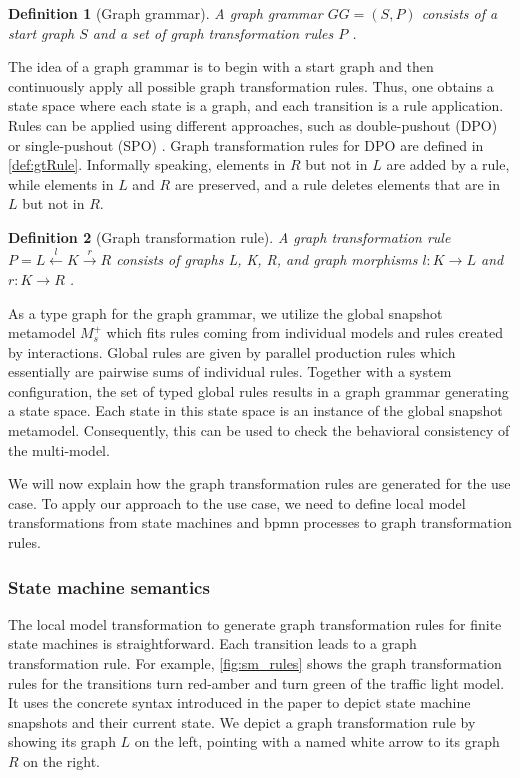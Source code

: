 \documentclass{jot}
\newtheorem{definition}{Definition}
\begin{document}
\begin{definition}[Graph grammar] \label{def:graphGrammar}
A graph grammar $GG=(S, P)$ consists of a start graph $S$ and a set of graph transformation rules $P$ \cite{ehrigFundamentalsAlgebraicGraph2006}. 
\end{definition}

The idea of a graph grammar is to begin with a start graph and then continuously apply all possible graph transformation rules.
Thus, one obtains a state space where each state is a graph, and each transition is a rule application.
Rules can be applied using different approaches, such as double-pushout (DPO) \cite{ehrigFundamentalsAlgebraicGraph2006} or single-pushout (SPO) \cite{loweAlgebraicApproachSinglepushout1993}.
Graph transformation rules for DPO are defined in \autoref{def:gtRule}.
Informally speaking, elements in $R$ but not in $L$ are added by a rule, while elements in $L$ and $R$ are preserved, and a rule deletes elements that are in $L$ but not in $R$.

\begin{definition}[Graph transformation rule] \label{def:gtRule}
A graph transformation rule $P= L \overset{l}{\leftarrow} K \overset{r}{\to} R$ consists of graphs L, K, R, and graph morphisms $l: K \to L$ and $r: K \to R$ \cite{ehrigFundamentalsAlgebraicGraph2006}. 
\end{definition}

As a type graph for the graph grammar, we utilize the global snapshot metamodel $M_s^+$ which fits rules coming from individual models and rules created by interactions.
Global rules are given by parallel production rules \cite[Definition 3.2.7]{baldanConcurrentSemanticsAlgebraic1999} which essentially are pairwise sums of individual rules.
Together with a system configuration, the set of typed global rules results in a graph grammar generating a state space.
Each state in this state space is an instance of the global snapshot metamodel.
Consequently, this can be used to check the behavioral consistency of the multi-model.

We will now explain how the graph transformation rules are generated for the use case.
To apply our approach to the use case, we need to define local model transformations from state machines and \gls*{bpmn} processes to graph transformation rules.

\subsubsection{State machine semantics}
The local model transformation to generate graph transformation rules for finite state machines is straightforward.
Each transition leads to a graph transformation rule.
For example, \autoref{fig:sm_rules} shows the graph transformation rules for the transitions \textsf{turn red-amber} and \textsf{turn green} of the traffic light model.
It uses the concrete syntax introduced in the paper to depict state machine snapshots and their current state.
We depict a graph transformation rule by showing its graph $L$ on the left, pointing with a named white arrow to its graph $R$ on the right.
\end{document}
